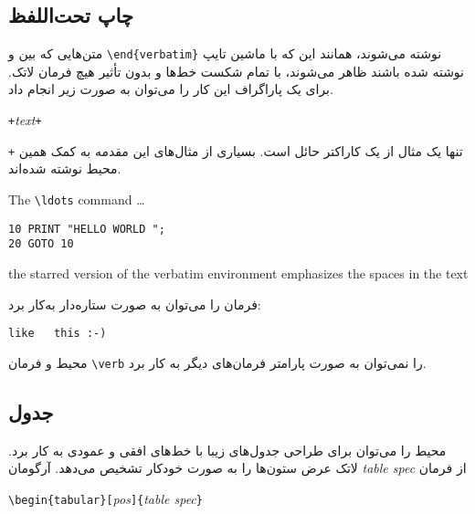 \subsection{چاپ تحت‌اللفظ}
متن‌هایی که بین 
و
\verb|\end{verbatim}| 
نوشته می‌شوند، همانند این که با ماشین تایپ نوشته شده باشند ظاهر می‌شوند، با تمام شکست خط‌ها و بدون تأثیر هیچ فرمان لاتک. برای یک پاراگراف این کار را می‌توان به صورت زیر انجام داد.
\begin{lscommand}
\verb|+|\emph{text}\verb|+|
\end{lscommand}
\noindent \verb|+| 
تنها یک مثال از یک کاراکتر حائل است. بسیاری از مثال‌های این مقدمه به کمک همین محیط نوشته شده‌اند.

\begin{example}
The \verb|\ldots| command \ldots

\begin{verbatim}
10 PRINT "HELLO WORLD ";
20 GOTO 10
\end{verbatim}
\end{example}

\begin{example}
\begin{verbatim*}
the starred version of
the      verbatim   
environment emphasizes
the spaces   in the text
\end{verbatim*}
\end{example}
فرمان
را می‌توان به صورت ستاره‌دار به‌کار برد:

\begin{example}
\verb*|like   this :-) |
\end{example}
محیط 
و فرمان 
\verb|\verb|
را نمی‌توان به صورت پارامتر فرمان‌های دیگر به کار برد.

\subsection{جدول}

\newcommand{\mfr}[1]{\lr{\framebox{\rule{0pt}{0.7em}\texttt{#1}}}}

محیط 
را می‌توان برای طراحی جدول‌های زیبا با خط‌های افقی و عمودی به کار برد. لاتک عرض ستون‌ها را به صورت خودکار تشخیص می‌دهد. آرگومان 
\emph{table spec}
از فرمان

\begin{lscommand}
\verb|\begin{tabular}[|\emph{pos}\verb|]{|\emph{table spec}\verb|}|
\end{lscommand} 

